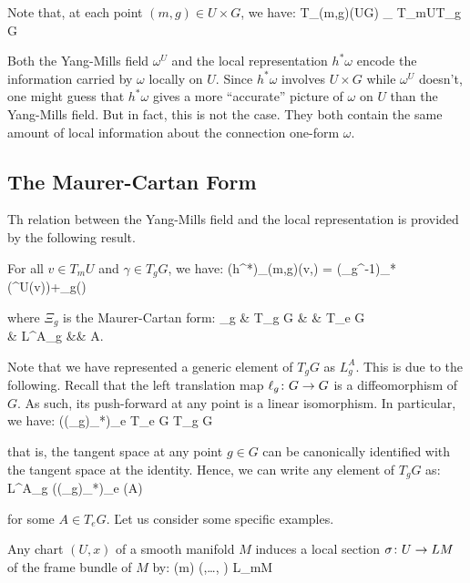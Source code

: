 Note that, at each point $(m,g)\in U\times G$, we have:
\bse
T_{(m,g)}(U\times G) \cong_{} T_mU\oplus T_g G
\ese

Both the Yang-Mills field $\omega^U$ and the local representation $h^*\omega$ encode the information carried by
$\omega$ locally on $U$. Since $h^*\omega$ involves $U\times G$ while $\omega^U$ doesn't, one might guess that
$h^*\omega$ gives a more ``accurate'' picture of $\omega$ on $U$ than the Yang-Mills field. But in fact, this is not
the case. They both contain the same amount of local information about the connection one-form $\omega$.

\subsection{The Maurer-Cartan Form}

Th relation between the Yang-Mills field and the local representation is provided by the following result.

\bt[]
For all $v\in T_m U$ and $\gamma \in T_g G$, we have:
\bse
(h^*\omega)_{(m,g)}(v,\gamma) = (\Ad_{g^{-1}})_*(\omega^U(v))+\Xi_g(\gamma)
\ese

where $\Xi_g$ is the Maurer-Cartan form:
\Xi_g \cl & T_g G & \xrightarrow{\sim} & T_e G\\ & L^A_g &\mapsto & A.
\ei
\et

\vspace{10pt}


Note that we have represented a generic element of $T_g G$ as $L^A_g$. This is due to the following. Recall that the
left translation map $\ell_g\colon G \to G$ is a diffeomorphism of $G$. As such, its push-forward at any point is a
linear isomorphism. In particular, we have:
\bse
((\ell_g)_*)_e \cl T_e G \xrightarrow{\sim} T_g G
\ese

that is, the tangent space at any point $g\in G$ can be canonically identified with the tangent space at the identity.
Hence, we can write any element of $T_g G$ as:
\bse
L^A_g \coloneqq ((\ell_g)_*)_e (A)
\ese

for some $A\in T_e G$. \v

Let us consider some specific examples.

\be
Any chart $(U,x)$ of a smooth manifold $M$ induces a local section $\sigma\colon U\to LM$ of the frame bundle of $M$ by:
\bse
\sigma(m) \coloneqq \biggl(,\ldots, \biggr) \in L_mM
\ese

